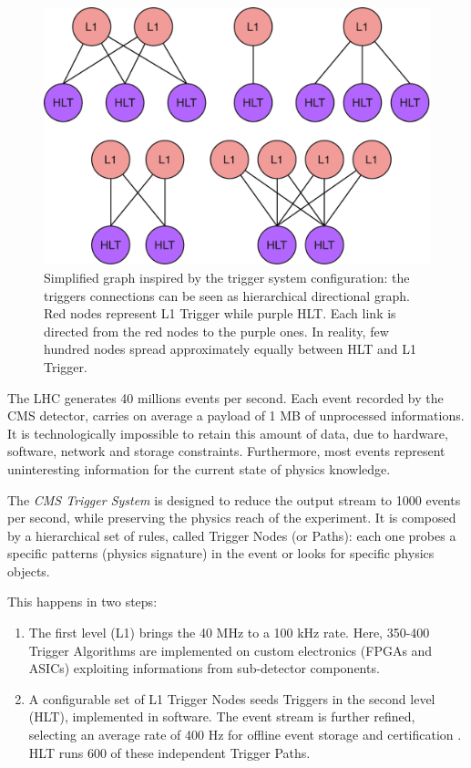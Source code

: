 \begin{figure}
    \centerline{
        \includegraphics[width=0.5\paperwidth]{figures/triggers.pdf}}
    \caption{Simplified graph inspired by the trigger system configuration: the triggers connections can be seen as hierarchical directional graph. Red nodes represent L1 Trigger while purple HLT. Each link is directed from the red nodes to the purple ones. In reality, few hundred nodes spread approximately equally between HLT and L1 Trigger. \cite{adpol-cvae}}
    \label{fig:triggers}
\end{figure}


The LHC generates 40 millions events per second. Each event recorded by the CMS detector, carries on average a payload of 1 MB of unprocessed informations. It is technologically impossible to retain this amount of data, due to hardware, software, network and storage constraints. Furthermore, most events represent uninteresting information for the current state of physics knowledge.

The \textit{CMS Trigger System} is designed to reduce the output stream to 1000 events per second, while preserving the physics reach of the experiment.
It is composed by a hierarchical set of rules, called Trigger Nodes (or Paths): each one probes a specific patterns (physics signature) in the event or looks for specific physics objects.

This happens in two steps:

\begin{enumerate}

    \item The first level (L1) \cite{Bayatyan:706847} brings the 40 MHz to a 100 kHz rate. Here, 350-400 \cite{Sirunyan:2721198} Trigger Algorithms are implemented on custom electronics (FPGAs and ASICs) exploiting informations from sub-detector components.

    \item A configurable set of L1 Trigger Nodes seeds Triggers in the second level (HLT), implemented in software. The event stream is further refined, selecting an average rate of 400 Hz for offline event storage and certification \cite{Khachatryan_2017}. HLT runs 600 of these independent Trigger Paths.

\end{enumerate}

